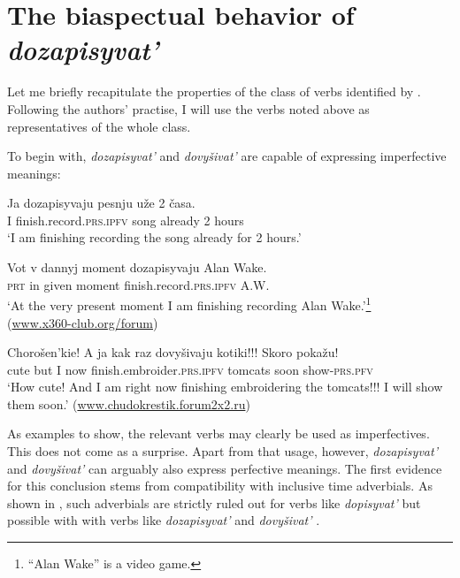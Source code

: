 \documentclass[output=paper,
colorlinks,
citecolor=brown,
newtxmath
]{langscibook}
\begin{document}

\section{The biaspectual behavior of \textit{dozapisyvat'}}\label{sec2}

Let me briefly recapitulate the properties of the class of verbs identified by \citet{Zinova.Filip2015}. Following the authors' practise, I will use the verbs noted above as representatives of the whole class.

To begin with, \textit{dozapisyvat'} and \textit{dovyšivat'} are capable of expressing imperfective meanings:

\ea\label{songpfin1}
\gll Ja dozapisyvaju pesnju uže 2 časa.\\
I {finish.record.}\textsc{prs.ipfv} song already 2 hours\\
\glt `I am finishing recording the song already for 2 hours.' \hfill \citep[16]{Zinova2016}
\z

\ea\label{songipf2}
\gll Vot v dannyj moment dozapisyvaju {Alan Wake}.\\
 \textsc{prt} in given moment {finish.record.}\textsc{prs.ipfv} A.W.\\
\glt `At the very present moment I am finishing recording Alan Wake.'\footnote{``Alan Wake'' is a video game.}  \\ \hfill (\url{www.x360-club.org/forum})
\z

\ea\label{kotiki}
\gll Chorošen'kie! A ja {kak raz} dovyšivaju kotiki!!! Skoro pokažu!\\
 cute but I now {finish.embroider.}\textsc{prs.ipfv} tomcats
 soon show-\textsc{prs.pfv}\\
\glt `How cute! And I am right now finishing embroidering the tomcats!!! I will show them soon.' \hfill (\url{www.chudokrestik.forum2x2.ru})
\z

\noindent As examples  to  show, the relevant verbs may clearly be used as imperfectives. This does not come as a surprise. Apart from that usage, however, \textit{dozapisyvat'} and \textit{dovyšivat'} can arguably also express perfective meanings. The first evidence for this conclusion stems from compatibility with inclusive time adverbials. As shown in \citet[16]{Zinova2016}, such adverbials are strictly ruled out for verbs like \textit{dopisyvat'}  but possible with with verbs like \textit{dozapisyvat'}  and \textit{dovyšivat'} .
\end{document}

